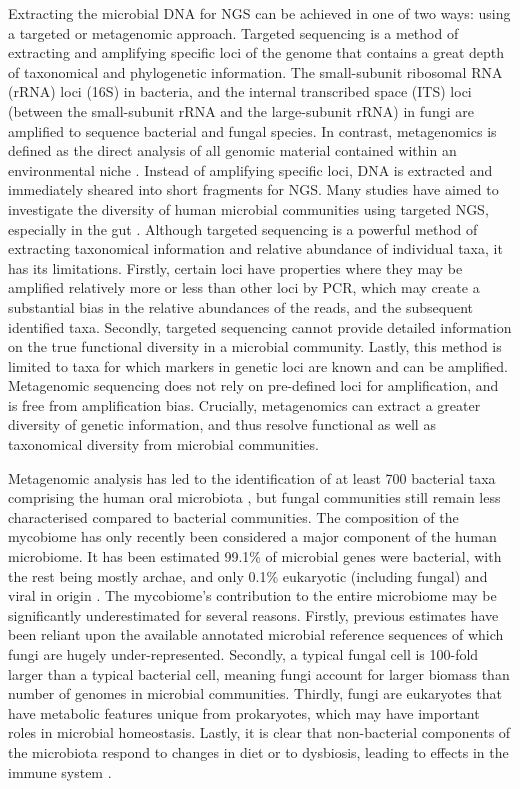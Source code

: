 \documentclass[a4paper]{article}
\begin{document}
Extracting the microbial DNA for NGS can be achieved in one of two ways: using a targeted or metagenomic approach. Targeted sequencing is a method of extracting and amplifying specific loci of the genome that contains a great depth of taxonomical and phylogenetic information. The small-subunit ribosomal RNA (rRNA) loci (16S) in bacteria, and the internal transcribed space (ITS) loci (between the small-subunit rRNA and the large-subunit rRNA) in fungi are amplified to sequence bacterial and fungal species. In contrast, metagenomics is defined as the direct analysis of all genomic material contained within an environmental niche \cite{roumpeka_review_2017}. Instead of amplifying specific loci, DNA is extracted and immediately sheared into short fragments for NGS. Many studies have aimed to investigate the diversity of human microbial communities using targeted NGS, especially in the gut \cite{yatsunenko_human_2012, human_microbiome_project_consortium_framework_2012}. Although targeted sequencing is a powerful method of extracting taxonomical information and relative abundance of individual taxa, it has its limitations. Firstly, certain loci have properties where they may be amplified relatively more or less than other loci by PCR, which may create a substantial bias in the relative abundances of the reads, and the subsequent identified taxa. Secondly, targeted sequencing cannot provide detailed information on the true functional diversity in a microbial community. Lastly, this method is limited to taxa for which markers in genetic loci are known and can be amplified. Metagenomic sequencing does not rely on pre-defined loci for amplification, and is free from amplification bias. Crucially, metagenomics can extract a greater diversity of genetic information, and thus resolve functional as well as taxonomical diversity from microbial communities.

Metagenomic analysis has led to the identification of at least 700 bacterial taxa comprising the human oral microbiota \cite{jenkinson_beyond_2011}, but fungal communities still remain less characterised compared to bacterial communities. The composition of the mycobiome has only recently been considered a major component of the human microbiome. It has been estimated 99.1\% of microbial genes were bacterial, with the rest being mostly archae, and only 0.1\% eukaryotic (including fungal) and viral in origin \cite{qin_human_2010,li_integrated_2014}. The mycobiome's contribution to the entire microbiome may be significantly underestimated for several reasons. Firstly, previous estimates have been reliant upon the available annotated microbial reference sequences of which fungi are hugely under-represented. Secondly, a typical fungal cell is 100-fold larger than a typical bacterial cell, meaning fungi account for larger biomass than number of genomes in microbial communities. Thirdly, fungi are eukaryotes that have metabolic features unique from prokaryotes, which may have important roles in microbial homeostasis. Lastly, it is clear that non-bacterial components of the microbiota respond to changes in diet or to dysbiosis, leading to effects in the immune system \cite{devkota_dietary-fat-induced_2012, bull-otterson_metagenomic_2013}.
\end{document}
